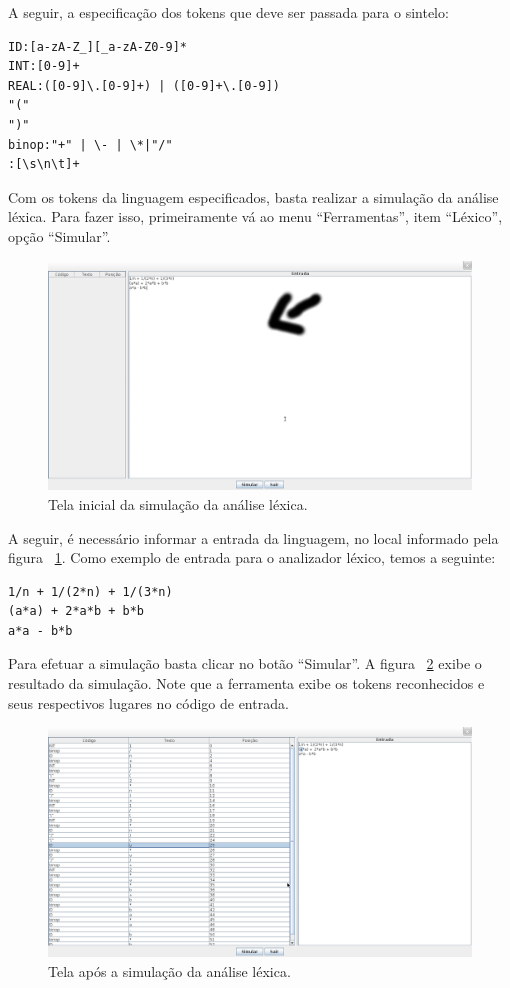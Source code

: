 A seguir, a especificação dos tokens que deve ser passada para o sintelo:
\begin{verbatim}
ID:[a-zA-Z_][_a-zA-Z0-9]*
INT:[0-9]+
REAL:([0-9]\.[0-9]+) | ([0-9]+\.[0-9])
"("
")"
binop:"+" | \- | \*|"/"
:[\s\n\t]+
\end{verbatim}

Com os tokens da linguagem especificados, basta realizar a simulação da análise léxica. Para fazer isso, primeiramente vá ao menu ``Ferramentas'', item ``Léxico'', opção ``Simular''. 

\begin{figure}[ht!]
	\centering
	\includegraphics[scale=0.28]{imgs/sintelo-lexico-inicial}
	\caption{Tela inicial da simulação da análise léxica.}
	\label{sintelo-lexico-inicial}
\end{figure}

A seguir, é necessário informar a entrada da linguagem, no local informado pela figura ~\ref{sintelo-lexico-inicial}. Como exemplo de entrada para o analizador léxico, temos a seguinte:
\begin{verbatim}
1/n + 1/(2*n) + 1/(3*n)
(a*a) + 2*a*b + b*b
a*a - b*b
\end{verbatim}

Para efetuar a simulação basta clicar no botão ``Simular''. A figura ~\ref{sintelo-lexico-ok} exibe o resultado da simulação. Note que a ferramenta exibe os tokens reconhecidos e seus respectivos lugares no código de entrada.
\begin{figure}[ht!]
	\centering
	\includegraphics[scale=0.28]{imgs/sintelo-lexico-ok}
	\caption{Tela após a simulação da análise léxica.}
	\label{sintelo-lexico-ok}
\end{figure}

